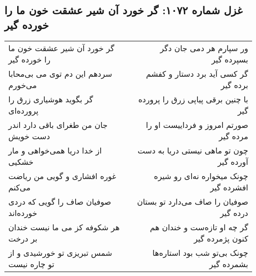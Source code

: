 \begin{center}
\section*{غزل شماره ۱۰۷۲: گر خورد آن شیر عشقت خون ما را خورده گیر}
\label{sec:1072}
\begin{longtable}{l p{0.5cm} r}
گر خورد آن شیر عشقت خون ما را خورده گیر
&&
ور سپارم هر دمی جان دگر بسپرده گیر
\\
سردهم این دم توی می بی‌محابا می‌خورم
&&
گر کسی آید برد دستار و کفشم برده گیر
\\
گر بگوید هوشیاری زرق را پرورده‌ای
&&
با چنین برقی پیاپی زرق را پرورده گیر
\\
جان من طغرای باقی دارد اندر دست خویش
&&
صورتم امروز و فرداییست او را مرده گیر
\\
از خدا دریا همی‌خواهی و مار خشکیی
&&
چون تو ماهی نیستی دریا به دست آورده گیر
\\
غوره افشاری و گویی من ریاضت می‌کنم
&&
چونک میخواره نه‌ای رو شیره افشرده گیر
\\
صوفیان صاف را گویی که دردی خورده‌اند
&&
صوفیان را صاف می‌دارد تو بستان درده گیر
\\
هر شکوفه کز می ما نیست خندان بر درخت
&&
گر چه او تازه‌ست و خندان هم کنون پژمرده گیر
\\
شمس تبریزی تو خورشیدی و از تو چاره نیست
&&
چونک بی‌تو شب بود استاره‌ها بشمرده گیر
\\
\end{longtable}
\end{center}
